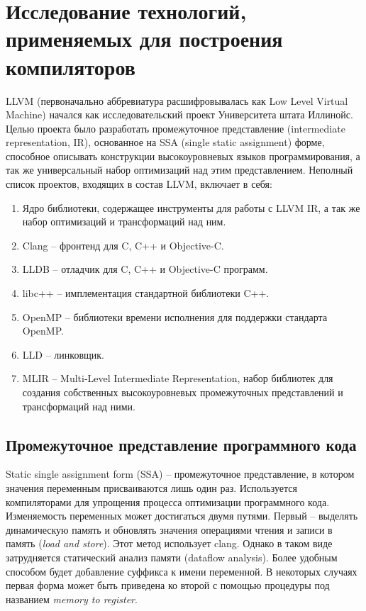 \clearpage

\section{Исследование технологий, применяемых для построения компиляторов}

LLVM (первоначально аббревиатура расшифровывалась как Low Level Virtual Machine) начался как
исследовательский проект Университета штата Иллинойс. Целью проекта было разработать промежуточное
представление (intermediate representation, IR), основанное на SSA (single static assignment) 
форме, способное описывать конструкции высокоуровневых языков программирования, а так же
универсальный набор оптимизаций над этим представлением. Неполный список проектов, входящих
в состав LLVM, включает в себя:

\begin{enumerate}
\item Ядро библиотеки, содержащее инструменты для работы с LLVM IR, а так же набор
оптимизаций и трансформаций над ним.
\item Clang -- фронтенд для C, C++ и Objective-C.
\item LLDB -- отладчик для C, C++ и Objective-C программ.
\item libc++ -- имплементация стандартной библиотеки C++.
\item OpenMP -- библиотеки времени исполнения для поддержки стандарта OpenMP.
\item LLD -- линковщик.
\item MLIR -- Multi-Level Intermediate Representation, набор библиотек для
создания собственных высокоуровневых промежуточных представлений и трансформаций
над ними. 
\end{enumerate}

\subsection{Промежуточное представление программного кода}
Static single assignment form (SSA) -- промежуточное представление, в котором
значения переменным присваиваются лишь один раз. Используется компиляторами для
упрощения процесса оптимизации программного кода. Изменяемость переменных может
достигаться двумя путями. Первый -- выделять динамическую память и обновлять
значения операциями чтения и записи в память (\textit{load and store}). Этот
метод использует clang. Однако в таком виде затрудняется статический анализ
памяти (dataflow analysis). Более удобным способом будет добавление суффикса к
имени переменной. В некоторых случаях первая форма может быть приведена ко 
второй с помощью процедуры под названием \textit{memory to register}.

